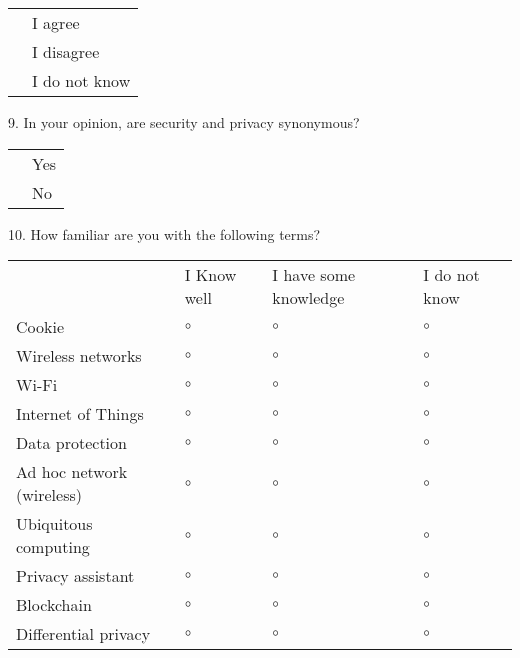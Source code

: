 \vspace{0.6cm}
\begin{center}
    \noindent\begin{tabularx}{0.8\textwidth}{ >{\centering\arraybackslash}X >{\raggedright\arraybackslash}X }
        {\huge $\circ$} & I agree \\[0.2cm]
        {\huge $\circ$} & I disagree \\[0.2cm]
        {\huge $\circ$} & I do not know
    \end{tabularx}
\end{center}
\vspace{0.6cm}

9. In your opinion, are security and privacy synonymous?

\vspace{0.6cm}
\begin{center}
    \noindent\begin{tabularx}{0.8\textwidth}{ >{\centering\arraybackslash}X >{\raggedright\arraybackslash}X }
        {\huge $\circ$} & Yes \\[0.2cm]
        {\huge $\circ$} & No
    \end{tabularx}
\end{center}
\vspace{0.6cm}

10. How familiar are you with the following terms?

\vspace{0.6cm}
\begin{center}
    \noindent\begin{tabular}{ p{4.5cm} p{3cm} p{4cm} p{3cm} }
        & I Know well & I have some knowledge & I do not know \\[0.4cm]
        Cookie & {\huge $\circ$} & {\huge $\circ$} & {\huge $\circ$} \\[0.2cm]
        Wireless networks & {\huge $\circ$} & {\huge $\circ$} & {\huge $\circ$} \\[0.2cm]
        Wi-Fi & {\huge $\circ$} & {\huge $\circ$} & {\huge $\circ$} \\[0.2cm]
        Internet of Things & {\huge $\circ$} & {\huge $\circ$} & {\huge $\circ$} \\[0.2cm]
        Data protection & {\huge $\circ$} & {\huge $\circ$} & {\huge $\circ$} \\[0.2cm]
        Ad hoc network (wireless) & {\huge $\circ$} & {\huge $\circ$} & {\huge $\circ$} \\[0.2cm]
        Ubiquitous computing & {\huge $\circ$} & {\huge $\circ$} & {\huge $\circ$} \\[0.2cm]
        Privacy assistant & {\huge $\circ$} & {\huge $\circ$} & {\huge $\circ$} \\[0.2cm]
        Blockchain & {\huge $\circ$} & {\huge $\circ$} & {\huge $\circ$} \\[0.2cm]
        Differential privacy & {\huge $\circ$} & {\huge $\circ$} & {\huge $\circ$}
    \end{tabular}
\end{center}
\vspace{0.6cm}

